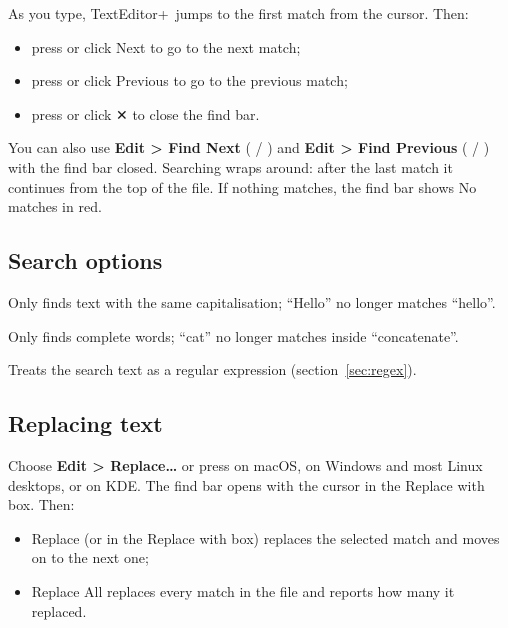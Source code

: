 \documentclass[11pt,a4paper]{article}
\newcommand{\appname}{TextEditor+}
\newcommand{\menu}[1]{\textsf{\textbf{#1}}}
\newcommand{\ui}[1]{\textsf{#1}}
\begin{document}
As you type, \appname\ jumps to the first match from the cursor. Then:

\begin{itemize}
  \item press  or click \ui{Next} to go to the next match;
  \item press  or click \ui{Previous} to go to the previous match;
  \item press  or click \ui{{\keyfont ✕}} to close the find bar.
\end{itemize}

You can also use \menu{Edit > Find Next} ( / ) and
\menu{Edit > Find Previous} ( / ) with the find bar closed.
Searching wraps around: after the last match it continues from the top of the
file. If nothing matches, the find bar shows \ui{No matches} in red.

\subsection{Search options}

\begin{description}[leftmargin=1.5em]
  \item[\ui{Match case}] Only finds text with the same capitalisation;
    ``Hello'' no longer matches ``hello''.
  \item[\ui{Whole word}] Only finds complete words; ``cat'' no longer matches
    inside ``concatenate''.
  \item[\ui{Regex}] Treats the search text as a regular expression
    (section~\ref{sec:regex}).
\end{description}

\subsection{Replacing text}

Choose \menu{Edit > Replace…} or press  on macOS,  on
Windows and most Linux desktops, or  on KDE. The find bar opens with
the cursor in the \ui{Replace with} box. Then:

\begin{itemize}
  \item \ui{Replace} (or  in the \ui{Replace with} box) replaces the
        selected match and moves on to the next one;
  \item \ui{Replace All} replaces every match in the file and reports how many
        it replaced.
\end{itemize}
\end{document}
